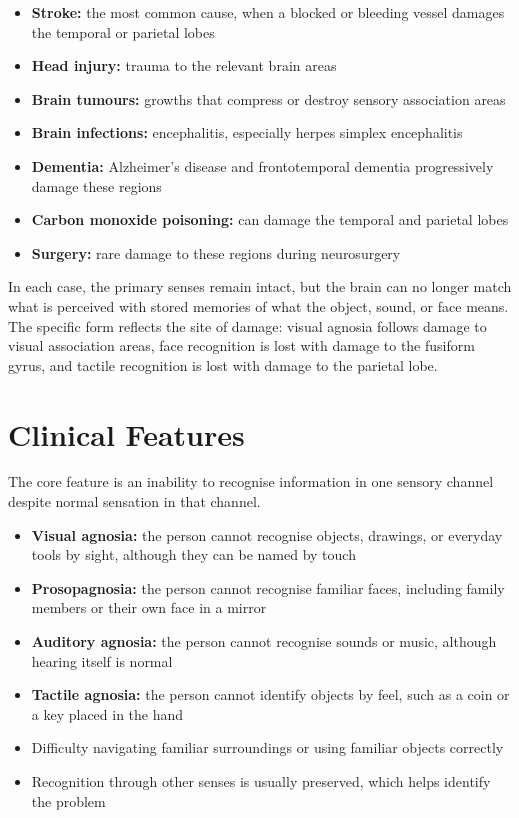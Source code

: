 \begin{itemize}
    \item \textbf{Stroke:} the most common cause, when a blocked or bleeding vessel damages the temporal or parietal lobes
    \item \textbf{Head injury:} trauma to the relevant brain areas
    \item \textbf{Brain tumours:} growths that compress or destroy sensory association areas
    \item \textbf{Brain infections:} encephalitis, especially herpes simplex encephalitis
    \item \textbf{Dementia:} Alzheimer's disease and frontotemporal dementia progressively damage these regions
    \item \textbf{Carbon monoxide poisoning:} can damage the temporal and parietal lobes
    \item \textbf{Surgery:} rare damage to these regions during neurosurgery
\end{itemize}

In each case, the primary senses remain intact, but the brain can no longer match what is perceived with stored memories of what the object, sound, or face means. The specific form reflects the site of damage: visual agnosia follows damage to visual association areas, face recognition is lost with damage to the fusiform gyrus, and tactile recognition is lost with damage to the parietal lobe.

\section*{Clinical Features}
The core feature is an inability to recognise information in one sensory channel despite normal sensation in that channel.

\begin{itemize}
    \item \textbf{Visual agnosia:} the person cannot recognise objects, drawings, or everyday tools by sight, although they can be named by touch
    \item \textbf{Prosopagnosia:} the person cannot recognise familiar faces, including family members or their own face in a mirror
    \item \textbf{Auditory agnosia:} the person cannot recognise sounds or music, although hearing itself is normal
    \item \textbf{Tactile agnosia:} the person cannot identify objects by feel, such as a coin or a key placed in the hand
    \item Difficulty navigating familiar surroundings or using familiar objects correctly
    \item Recognition through other senses is usually preserved, which helps identify the problem
\end{itemize}

